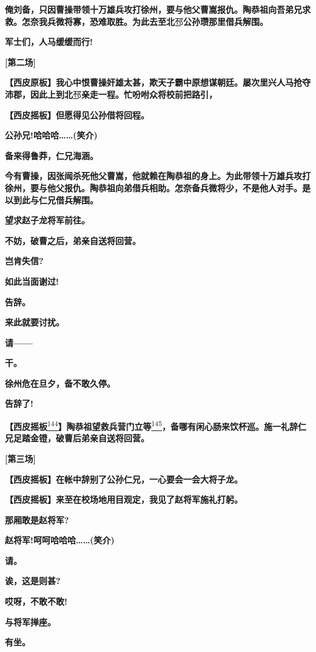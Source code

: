 \textbf{俺刘备，只因曹操带领十万雄兵攻打徐州，要与他父曹嵩报仇。陶恭祖向吾弟兄求救。怎奈我兵微将寡，恐难取胜。为此去至北}邳\textbf{公孙瓒那里借兵解围。}

\textbf{军士们，人马缓缓而行!}

\textbf{{[}第二场{]}}

\textbf{【西皮原板】我心中恨曹操奸雄太甚，欺天子霸中原想谋朝廷。屡次里兴人马抢夺沛郡，因此上到北}邳\textbf{亲走一程。忙吩咐众将校前把路引，}

\textbf{【西皮摇板】但愿得见公孙借将回程。}

\textbf{公孙兄!哈哈哈\ldots{}\ldots{}(笑介)}

\textbf{备来得鲁莽，仁兄海涵。}

\textbf{今有曹操，因张闿杀死他父曹嵩，他就赖在陶恭祖的身上。为此带领十万雄兵攻打徐州，要与他父报仇。陶恭祖向弟借兵相助。怎奈备兵微将少，不是他人对手。是以到此与仁兄借兵解围。}

\textbf{望求赵子龙将军前往。}

\textbf{不妨，破曹之后，弟亲自送将回营。}

\textbf{岂肯失信?}

\textbf{如此当面谢过!}

\textbf{告辞。}

\textbf{来此就要讨扰。}

\textbf{请------}

\textbf{干。}

\textbf{徐州危在旦夕，备不敢久停。}

\textbf{告辞了!}

\textbf{【西皮摇板}\protect\hyperlink{fn144}{\textsuperscript{144}}\textbf{】陶恭祖望救兵营门立等}\protect\hyperlink{fn145}{\textsuperscript{145}}\textbf{，备哪有闲心肠来饮杯巡。施一礼辞仁兄足踏金镫，破曹后弟亲自送将回营。}

\textbf{{[}第三场{]}}

\textbf{【西皮摇板】在帐中辞别了公孙仁兄，一心要会一会大将子龙。}

\textbf{【西皮摇板】来至在校场地用目观定，我见了赵将军施礼打躬。}

\textbf{那厢敢是赵将军?}

\textbf{赵将军!呵呵哈哈哈\ldots{}\ldots{}(笑介)}

\textbf{请。}

\textbf{诶，这是则甚?}

\textbf{哎呀，不敢不敢!}

\textbf{与将军掸座。}

\textbf{有坐。}

